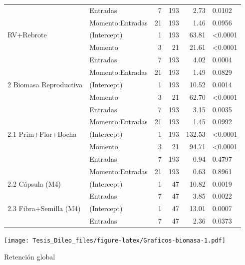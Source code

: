 \documentclass[12pt,oneside]{reedthesis}
\begin{document}
\begin{table}[!h]
{\begin{tabular}[t]{llrrrl}
 & Entradas & 7 & 193 & 2.73 & 0.0102\\
 & Momento:Entradas & 21 & 193 & 1.46 & 0.0956\\
\addlinespace
1.4 RV+Rebrote & (Intercept) & 1 & 193 & 63.81 & <0.0001\\
 & Momento & 3 & 21 & 21.61 & <0.0001\\
 & Entradas & 7 & 193 & 4.02 & 0.0004\\
 & Momento:Entradas & 21 & 193 & 1.49 & 0.0829\\
2 Biomasa Reproductiva & (Intercept) & 1 & 193 & 10.52 & 0.0014\\
\addlinespace
 & Momento & 3 & 21 & 62.70 & <0.0001\\
 & Entradas & 7 & 193 & 3.15 & 0.0035\\
 & Momento:Entradas & 21 & 193 & 1.45 & 0.0992\\
2.1 Prim+Flor+Bocha & (Intercept) & 1 & 193 & 132.53 & <0.0001\\
 & Momento & 3 & 21 & 94.71 & <0.0001\\
\addlinespace
 & Entradas & 7 & 193 & 0.94 & 0.4797\\
 & Momento:Entradas & 21 & 193 & 0.63 & 0.8961\\
2.2 Cápsula (M4) & (Intercept) & 1 & 47 & 10.82 & 0.0019\\
 & Entradas & 7 & 47 & 3.85 & 0.0022\\
2.3 Fibra+Semilla (M4) & (Intercept) & 1 & 47 & 13.01 & 0.0007\\
\addlinespace
 & Entradas & 7 & 47 & 2.36 & 0.0373\\
\bottomrule
\end{tabular}}
\end{table}

\texttt{[image: Tesis\_Dileo\_files/figure-latex/Graficos-biomasa-1.pdf]}

Retención global
\end{document}

